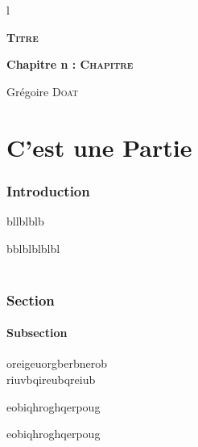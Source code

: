 





\begin{titlepage}
	\centering
	{\color{white}l}\par
	
	\vspace{6.5cm}
	
	{\Large\textbf{\textsc{Titre}}}\par
	\vspace{1.5cm}
	{\large \textbf{Chapitre n : \textsc{Chapitre}}}\par
	
	\vfill
	
	{\large Grégoire \textsc{Doat}}\par
	
	\vspace{1cm}
	
\end{titlepage}


\setcounter{page}{1}
\tableofcontents


\part{C'est une Partie}



\section*{Introduction}
{\color{white}bllblblb}

bblblblblbl
\\ \\




\section{Section}

\subsection{Subsection}
\quad
oreigeuorgberbnerob \\
riuvbqireubqreiub
\begin{definition}
	eobiqhroghqerpoug
\end{definition}


\begin{enonce}
	eobiqhroghqerpoug
\end{enonce}



